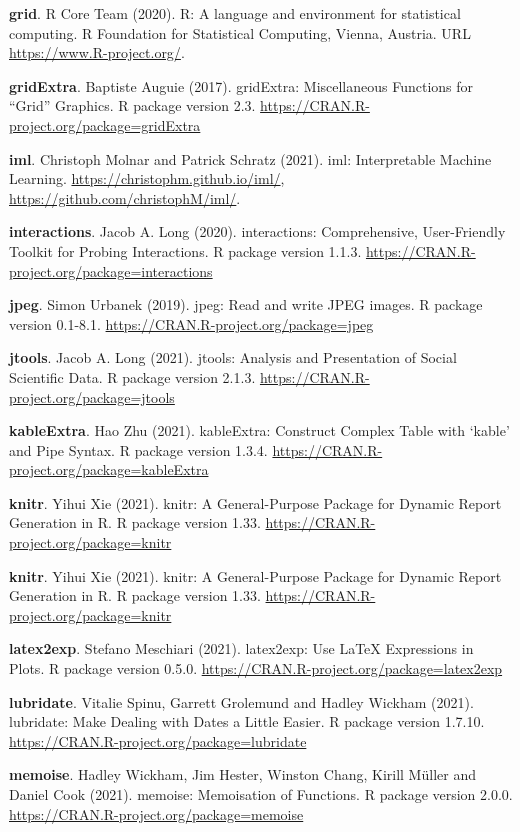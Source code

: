 \documentclass[12pt,]{krantz}
\begin{document}
\textbf{grid}. R Core Team (2020). R: A language and environment for
statistical computing. R Foundation for Statistical Computing, Vienna,
Austria. URL \url{https://www.R-project.org/}.

\textbf{gridExtra}. Baptiste Auguie (2017). gridExtra: Miscellaneous
Functions for ``Grid'' Graphics. R package version 2.3.
\url{https://CRAN.R-project.org/package=gridExtra}

\textbf{iml}. Christoph Molnar and Patrick Schratz (2021). iml:
Interpretable Machine Learning. \url{https://christophm.github.io/iml/},
\url{https://github.com/christophM/iml/}.

\textbf{interactions}. Jacob A. Long (2020). interactions:
Comprehensive, User-Friendly Toolkit for Probing Interactions. R package
version 1.1.3. \url{https://CRAN.R-project.org/package=interactions}

\textbf{jpeg}. Simon Urbanek (2019). jpeg: Read and write JPEG images. R
package version 0.1-8.1. \url{https://CRAN.R-project.org/package=jpeg}

\textbf{jtools}. Jacob A. Long (2021). jtools: Analysis and Presentation
of Social Scientific Data. R package version 2.1.3.
\url{https://CRAN.R-project.org/package=jtools}

\textbf{kableExtra}. Hao Zhu (2021). kableExtra: Construct Complex Table
with `kable' and Pipe Syntax. R package version 1.3.4.
\url{https://CRAN.R-project.org/package=kableExtra}

\textbf{knitr}. Yihui Xie (2021). knitr: A General-Purpose Package for
Dynamic Report Generation in R. R package version 1.33.
\url{https://CRAN.R-project.org/package=knitr}

\textbf{knitr}. Yihui Xie (2021). knitr: A General-Purpose Package for
Dynamic Report Generation in R. R package version 1.33.
\url{https://CRAN.R-project.org/package=knitr}

\textbf{latex2exp}. Stefano Meschiari (2021). latex2exp: Use LaTeX
Expressions in Plots. R package version 0.5.0.
\url{https://CRAN.R-project.org/package=latex2exp}

\textbf{lubridate}. Vitalie Spinu, Garrett Grolemund and Hadley Wickham
(2021). lubridate: Make Dealing with Dates a Little Easier. R package
version 1.7.10. \url{https://CRAN.R-project.org/package=lubridate}

\textbf{memoise}. Hadley Wickham, Jim Hester, Winston Chang, Kirill
Müller and Daniel Cook (2021). memoise: Memoisation of Functions. R
package version 2.0.0. \url{https://CRAN.R-project.org/package=memoise}
\end{document}
